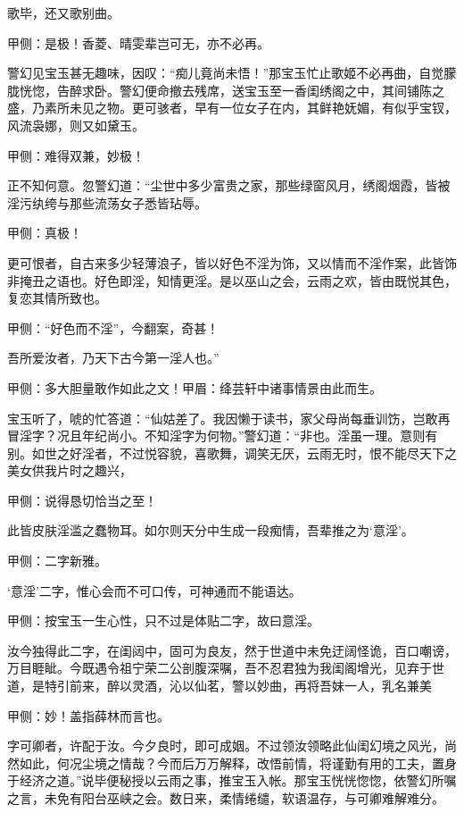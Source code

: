 \begin{parag}

    歌毕，还又歌别曲。\begin{note}甲侧：是极！香菱、晴雯辈岂可无，亦不必再。\end{note}警幻见宝玉甚无趣味，因叹：“痴儿竟尚未悟！”那宝玉忙止歌姬不必再曲，自觉朦胧恍惚，告醉求卧。警幻便命撤去残席，送宝玉至一香闺绣阁之中，其间铺陈之盛，乃素所未见之物。更可骇者，早有一位女子在内，其鲜艳妩媚，有似乎宝钗，风流袅娜，则又如黛玉。\begin{note}甲侧：难得双兼，妙极！\end{note}正不知何意。忽警幻道：“尘世中多少富贵之家，那些绿窗风月，绣阁烟霞，皆被淫污纨绔与那些流荡女子悉皆玷辱。\begin{note}甲侧：真极！\end{note}更可恨者，自古来多少轻薄浪子，皆以好色不淫为饰，又以情而不淫作案，此皆饰非掩丑之语也。好色即淫，知情更淫。是以巫山之会，云雨之欢，皆由既悦其色，复恋其情所致也。\begin{note}甲侧：“好色而不淫”，今翻案，奇甚！\end{note}吾所爱汝者，乃天下古今第一淫人也。”\begin{note}甲侧：多大胆量敢作如此之文！甲眉：绛芸轩中诸事情景由此而生。\end{note}宝玉听了，唬的忙答道：“仙姑差了。我因懒于读书，家父母尚每垂训饬，岂敢再冒淫字？况且年纪尚小。不知淫字为何物。”警幻道：“非也。淫虽一理。意则有别。如世之好淫者，不过悦容貌，喜歌舞，调笑无厌，云雨无时，恨不能尽天下之美女供我片时之趣兴，\begin{note}甲侧：说得恳切恰当之至！\end{note}此皆皮肤淫滥之蠢物耳。如尔则天分中生成一段痴情，吾辈推之为‘意淫’。\begin{note}甲侧：二字新雅。\end{note}‘意淫’二字，惟心会而不可口传，可神通而不能语达。\begin{note}甲侧：按宝玉一生心性，只不过是体贴二字，故曰意淫。\end{note}汝今独得此二字，在闺闼中，固可为良友，然于世道中未免迂阔怪诡，百口嘲谤，万目睚眦。今既遇令祖宁荣二公剖腹深嘱，吾不忍君独为我闺阁增光，见弃于世道，是特引前来，醉以灵酒，沁以仙茗，警以妙曲，再将吾妹一人，乳名兼美\begin{note}甲侧：妙！盖指薛林而言也。\end{note}字可卿者，许配于汝。今夕良时，即可成姻。不过领汝领略此仙闺幻境之风光，尚然如此，何况尘境之情哉？今而后万万解释，改悟前情，将谨勤有用的工夫，置身于经济之道。”说毕便秘授以云雨之事，推宝玉入帐。那宝玉恍恍惚惚，依警幻所嘱之言，未免有阳台巫峡之会。数日来，柔情绻缱，软语温存，与可卿难解难分。
\end{parag}



